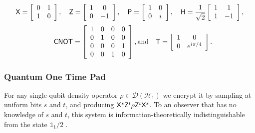 $${\sf X} = \left[\begin{array}{cc} 0 & 1\\ 1 & 0\end{array}\right],
\quad{\sf Z} = \left[\begin{array}{cc} 1 & 0\\ 0 & -1\end{array}\right],
\quad{\sf P} = \left[\begin{array}{cc} 1 & 0\\ 0 & i\end{array}\right],
 \quad{\sf H} = \frac{1}{\sqrt{2}}\left[\begin{array}{cc}1 & 1\\1 & -1\end{array}\right], $$
$$\quad{\sf CNOT} = \left[\begin{array}{cccc} 1 & 0 & 0 & 0\\ 0 & 1 & 0 & 0\\ 0 & 0 & 0 & 1\\ 0 & 0 & 1 & 0\end{array}\right], \text{and} 
\quad{\sf T} = \left[\begin{array}{cc} 1 & 0\\ 0 & e^{i\pi/4}\end{array}\right].$$

\subsubsection*{Quantum One Time Pad}
For any single-qubit density operator $\rho \in \mathcal{D} (\mathcal{H}_1)$ we encrypt it by sampling at uniform bits $s$ and $t$, and producing 
 ${\sf X}^s {\sf Z}^t \rho {\sf Z}^t {\sf X}^s$. To an observer that has no knowledge of $s$ and $t$, this system is information-theoretically indistinguishable from the state $\mathds{1}_1/2$ \cite{AMTW00}.

%

